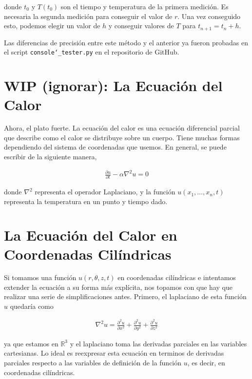 \documentclass[letter]{tufte-handout} %
\begin{document}
donde $t_0$ y $T(t_0)$ son el tiempo y temperatura de la primera medición. Es necesaria la segunda
medición para conseguir el valor de $r$. Una vez conseguido esto, podemos elegir un valor de $h$
y conseguir valores de $T$ para $t_{n+1} = t_n + h$.

Las diferencias de precisión entre este método y el anterior ya fueron probadas en el script
\texttt{console\char`_tester.py} en el repositorio de GitHub.





\newpage
\section{WIP (ignorar): La Ecuación del Calor}\label{sec:scenario2}

Ahora, el plato fuerte. La ecuación del calor es una ecuación diferencial parcial que describe como
el calor se distribuye sobre un cuerpo. Tiene muchas formas
dependiendo del sistema de coordenadas que usemos. En general, se puede escribir de la siguiente manera,

\begin{align}
	\frac{\partial u}{\partial t} - \alpha \nabla^2 u = 0
\end{align}

donde $\nabla^2$ representa el operador Laplaciano, y la función $u(x_1,\ldots,x_n,t)$ representa
la temperatura en un punto y tiempo dado.

\section{La Ecuación del Calor en Coordenadas Cilíndricas}
Si tomamos una función $u(r, \theta, z, t)$ en coordenadas cilíndricas e intentamos extender la
ecuación a su forma más explícita, nos topamos con que hay que realizar una serie de simplificaciones
antes. Primero, el laplaciano de esta función $u$ quedaría como

\begin{align}
	\nabla^2 u = \frac{\partial^2 u}{\partial x^2} + \frac{\partial^2 u}{\partial y^2} + \frac{\partial^2 u}{\partial z^2}
\end{align}

ya que estamos en $\mathbb{R}^3$ y el laplaciano toma las derivadas parciales en las variables
cartesianas. Lo ideal es reexpresar esta ecuación en terminos de derivadas parciales respecto a
las variables de definición de la función $u$, es decir, en coordenadas cilíndricas.
\end{document}
